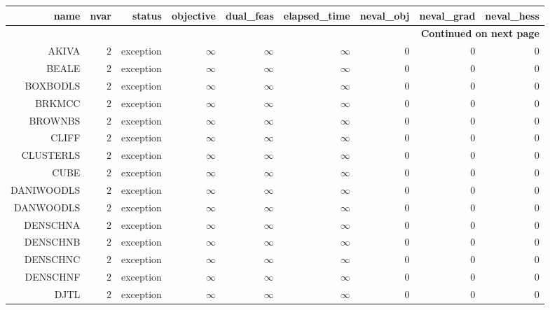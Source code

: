 \begin{longtable}{rrrrrrrrr}
\hline
name & nvar & status & objective & dual\_feas & elapsed\_time & neval\_obj & neval\_grad & neval\_hess \\\hline
\endhead
\hline
\multicolumn{9}{r}{{\bfseries Continued on next page}}\\
\hline
\endfoot
\endlastfoot
AKIVA & \(     2\) & exception & \(\infty\) & \(\infty\) & \(\infty\) & \(     0\) & \(     0\) & \(     0\) \\
BEALE & \(     2\) & exception & \(\infty\) & \(\infty\) & \(\infty\) & \(     0\) & \(     0\) & \(     0\) \\
BOXBODLS & \(     2\) & exception & \(\infty\) & \(\infty\) & \(\infty\) & \(     0\) & \(     0\) & \(     0\) \\
BRKMCC & \(     2\) & exception & \(\infty\) & \(\infty\) & \(\infty\) & \(     0\) & \(     0\) & \(     0\) \\
BROWNBS & \(     2\) & exception & \(\infty\) & \(\infty\) & \(\infty\) & \(     0\) & \(     0\) & \(     0\) \\
CLIFF & \(     2\) & exception & \(\infty\) & \(\infty\) & \(\infty\) & \(     0\) & \(     0\) & \(     0\) \\
CLUSTERLS & \(     2\) & exception & \(\infty\) & \(\infty\) & \(\infty\) & \(     0\) & \(     0\) & \(     0\) \\
CUBE & \(     2\) & exception & \(\infty\) & \(\infty\) & \(\infty\) & \(     0\) & \(     0\) & \(     0\) \\
DANIWOODLS & \(     2\) & exception & \(\infty\) & \(\infty\) & \(\infty\) & \(     0\) & \(     0\) & \(     0\) \\
DANWOODLS & \(     2\) & exception & \(\infty\) & \(\infty\) & \(\infty\) & \(     0\) & \(     0\) & \(     0\) \\
DENSCHNA & \(     2\) & exception & \(\infty\) & \(\infty\) & \(\infty\) & \(     0\) & \(     0\) & \(     0\) \\
DENSCHNB & \(     2\) & exception & \(\infty\) & \(\infty\) & \(\infty\) & \(     0\) & \(     0\) & \(     0\) \\
DENSCHNC & \(     2\) & exception & \(\infty\) & \(\infty\) & \(\infty\) & \(     0\) & \(     0\) & \(     0\) \\
DENSCHNF & \(     2\) & exception & \(\infty\) & \(\infty\) & \(\infty\) & \(     0\) & \(     0\) & \(     0\) \\
DJTL & \(     2\) & exception & \(\infty\) & \(\infty\) & \(\infty\) & \(     0\) & \(     0\) & \(     0\) \\

\end{longtable}
